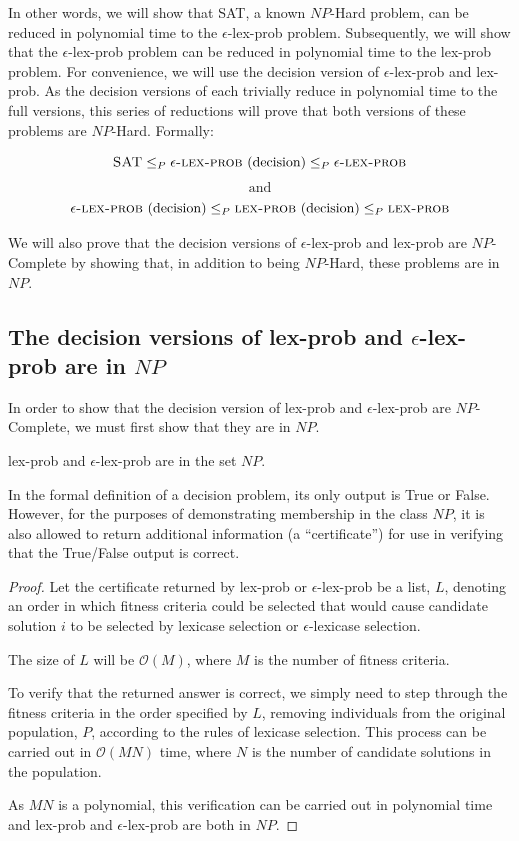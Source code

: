\documentclass[sigconf]{acmart}
\begin{document}
In other words, we will show that {\sc SAT}, a known $NP$-Hard problem, can be reduced in polynomial time to the {\sc $\epsilon$-lex-prob} problem. Subsequently, we will show that the {\sc $\epsilon$-lex-prob} problem can be reduced in polynomial time to the {\sc lex-prob} problem. For convenience, we will use the decision version of {\sc $\epsilon$-lex-prob} and {\sc lex-prob}. As the decision versions of each trivially reduce in polynomial time to the full versions, this series of reductions will prove that both versions of these problems are $NP$-Hard. Formally:

\[
\text{{\sc SAT}} \leq_{P} \text{{\sc $\epsilon$-lex-prob} (decision)} \leq_{P} \text{{\sc $\epsilon$-lex-prob}}
\]
\[
\text{and}
\]
\[
\text{{\sc $\epsilon$-lex-prob} (decision)} \leq_{P} \text{{\sc lex-prob} (decision)} \leq_{P} \text{{\sc lex-prob}}
\]

We will also prove that the decision versions of {\sc $\epsilon$-lex-prob} and {\sc lex-prob} are $NP$-Complete by showing that, in addition to being $NP$-Hard, these problems are in $NP$.

\subsection{The decision versions of {\sc lex-prob} and {\sc $\epsilon$-lex-prob} are in $NP$}

In order to show that the decision version of {\sc lex-prob} and {\sc $\epsilon$-lex-prob} are $NP$-Complete, we must first show that they are in $NP$.

\begin{theorem}
\label{np_theorem}
{\sc lex-prob} and {\sc $\epsilon$-lex-prob} are in the set $NP$.
\end{theorem}

In the formal definition of a decision problem, its only output is True or False. However, for the purposes of demonstrating membership in the class $NP$, it is also allowed to return additional information (a ``certificate'') for use in verifying that the True/False output is correct. 

\begin{proof}
    Let the certificate returned by {\sc lex-prob} or {\sc $\epsilon$-lex-prob} be a list, $L$, denoting an order in which fitness criteria could be selected that would cause candidate solution $i$ to be selected by lexicase selection or $\epsilon$-lexicase selection.

    The size of $L$ will be $\mathcal{O}(M)$, where $M$ is the number of fitness criteria.

    To verify that the returned answer is correct, we simply need to step through the fitness criteria in the order specified by $L$, removing individuals from the original population, $P$, according to the rules of lexicase selection. This process can be carried out in $\mathcal{O}(MN)$ time, where $N$ is the number of candidate solutions in the population.

    As $MN$ is a polynomial, this verification can be carried out in polynomial time and {\sc lex-prob} and {\sc $\epsilon$-lex-prob} are both in $NP$.
\end{proof}
\end{document}
